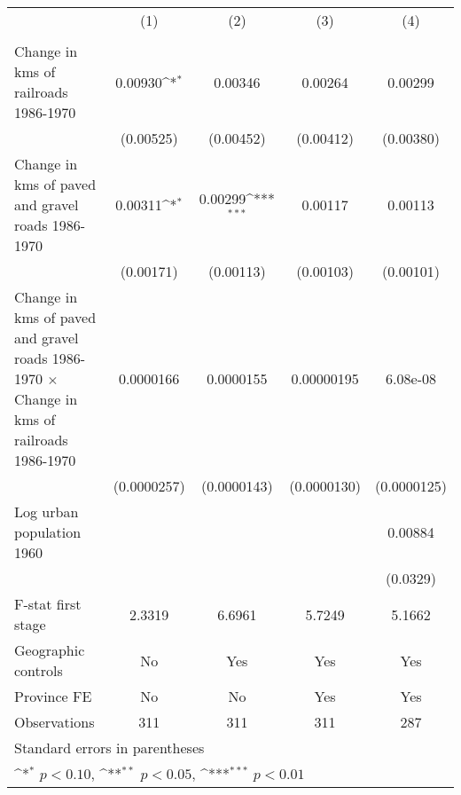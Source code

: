 {
\def\sym#1{\ifmmode^{#1}\else\(^{#1}\)\fi}
\begin{tabular}{l*{4}{c}}
\hline\hline
                &\multicolumn{1}{c}{(1)}&\multicolumn{1}{c}{(2)}&\multicolumn{1}{c}{(3)}&\multicolumn{1}{c}{(4)}\\
                &\multicolumn{1}{c}{}&\multicolumn{1}{c}{}&\multicolumn{1}{c}{}&\multicolumn{1}{c}{}\\
\hline
Change in kms of railroads 1986-1970&  0.00930\sym{*}  &  0.00346         &  0.00264         &  0.00299         \\
                &(0.00525)         &(0.00452)         &(0.00412)         &(0.00380)         \\
[1em]
Change in kms of paved and gravel roads 1986-1970&  0.00311\sym{*}  &  0.00299\sym{***}&  0.00117         &  0.00113         \\
                &(0.00171)         &(0.00113)         &(0.00103)         &(0.00101)         \\
[1em]
Change in kms of paved and gravel roads 1986-1970 $\times$ Change in kms of railroads 1986-1970&0.0000166         &0.0000155         &0.00000195         & 6.08e-08         \\
                &(0.0000257)         &(0.0000143)         &(0.0000130)         &(0.0000125)         \\
[1em]
Log urban population 1960&                  &                  &                  &  0.00884         \\
                &                  &                  &                  & (0.0329)         \\
\hline
F-stat first stage&   2.3319         &   6.6961         &   5.7249         &   5.1662         \\
Geographic controls&       No         &      Yes         &      Yes         &      Yes         \\
Province FE     &       No         &       No         &      Yes         &      Yes         \\
Observations    &      311         &      311         &      311         &      287         \\
\hline\hline
\multicolumn{5}{l}{\footnotesize Standard errors in parentheses}\\
\multicolumn{5}{l}{\footnotesize \sym{*} \(p<0.10\), \sym{**} \(p<0.05\), \sym{***} \(p<0.01\)}\\
\end{tabular}
}
